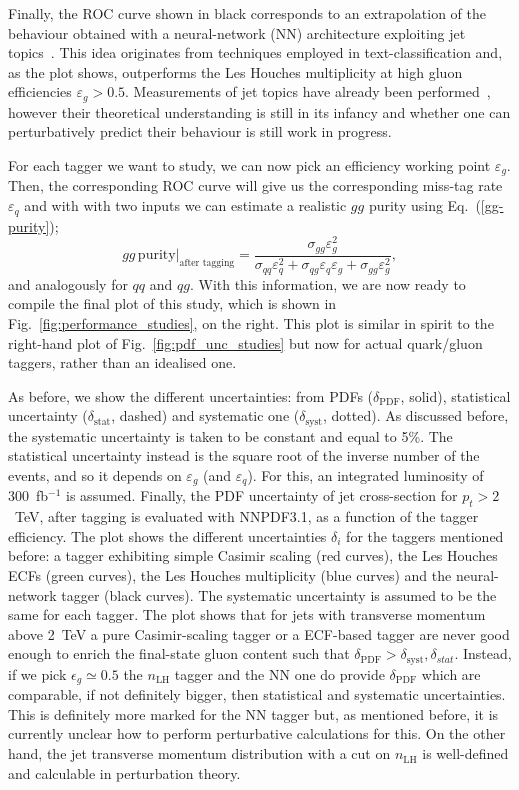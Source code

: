 Finally, the ROC curve shown in black corresponds to an extrapolation of the behaviour obtained with a neural-network (NN) architecture exploiting jet topics~\cite{}. This idea originates from techniques employed in text-classification and, as the plot shows, outperforms the Les Houches multiplicity at high gluon efficiencies $\varepsilon_g > 0.5$. Measurements of jet topics have already been performed~\cite{}, however their theoretical understanding is still in its infancy and whether one can perturbatively predict their behaviour is still work in progress.

For each tagger we want to study, we can now pick an efficiency working point $\varepsilon_g$. Then, the corresponding ROC curve will give us the corresponding miss-tag rate $\varepsilon_q$ and with with two inputs we can estimate a realistic $gg$ purity using Eq.~(\ref{gg-purity});
\begin{equation}\label{gg-purity-after-tagging}
gg \, \text{purity}\Big|_\text{after tagging}= \frac{\sigma_{gg} \varepsilon_g^2}{\sigma_{qq}\varepsilon_q^2+\sigma_{qg}\varepsilon_q \varepsilon_g +\sigma_{gg} \varepsilon_g^2},
\end{equation}
and analogously for $qq$ and $qg$. With this information, we are now ready to compile the final plot of this study, which is shown in Fig.~\ref{fig:performance_studies}, on the right. 
This plot is similar in spirit to the right-hand plot of Fig.~\ref{fig:pdf_unc_studies} but now for actual quark/gluon taggers, rather than an idealised one.

As before, we show the different uncertainties: from PDFs ($\delta_\text{PDF}$, solid), statistical uncertainty ($\delta_\text{stat}$, dashed) and systematic one ($\delta_\text{syst}$, dotted). As discussed before, the systematic uncertainty is taken to be constant and equal to 5\%. The statistical uncertainty instead is the square root of the inverse number of the events, and so it  depends on $\varepsilon_g$ (and $\varepsilon_q$). For this, an integrated luminosity of 300~fb$^{-1}$ is assumed. Finally,  the PDF uncertainty of jet cross-section for $p_t>2$~TeV, after tagging is evaluated with NNPDF3.1, as a function of the tagger efficiency. 
%
The plot shows the different uncertainties $\delta_i$ for the taggers mentioned before: a tagger exhibiting simple Casimir scaling (red curves), the Les Houches ECFs (green curves), the Les Houches multiplicity (blue curves) and the neural-network tagger (black curves). The systematic uncertainty is assumed to be the same for each tagger. 
%
The plot shows that for jets with transverse momentum above 2~TeV a pure Casimir-scaling tagger or a ECF-based tagger are never good enough to enrich the final-state gluon content such that $\delta_\text{PDF}> \delta_\text{syst}, \delta_{stat}$.
%
Instead, if we pick $\epsilon_g\simeq 0.5$ the $n_\text{LH}$ tagger and the NN one do provide $\delta_\text{PDF}$ which are comparable, if not definitely bigger, then statistical and systematic uncertainties. This is definitely more marked for the NN tagger but, as mentioned before, it is currently unclear how to perform perturbative calculations for this. On the other hand, the jet transverse momentum distribution with a cut on $n_\text{LH}$ is well-defined and calculable in perturbation theory. 
